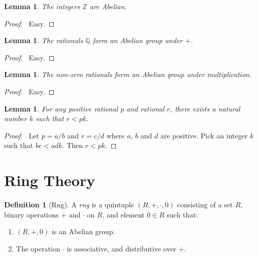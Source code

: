 \documentclass{article}
\let\qed\relax
\newtheorem{lemma}[axiom]{Lemma}
\theoremstyle{definition}
\newtheorem{definition}[axiom]{Definition}
\begin{document}
    \begin{lemma}
        The integers $\mathbb{Z}$ are Abelian.
    \end{lemma}

    \begin{proof}
        \pf\ Easy. \qed
    \end{proof}

    \begin{lemma}
        The rationals $\mathbb{Q}$ form an Abelian group under $+$.
    \end{lemma}

    \begin{proof}
        \pf\ Easy.
    \end{proof}

    \begin{lemma}
        The non-zero rationals form an Abelian group under multiplication.
    \end{lemma}

    \begin{proof}
        \pf\ Easy. \qed
    \end{proof}

    \begin{lemma}
        \label{lemma:rationals_Archimedean}
        For any positive rational $p$ and rational $r$, there exists a natural number $k$ such that
        $r < pk$.
    \end{lemma}

    \begin{proof}
        \pf\ Let $p = a/b$ and $r = c/d$ where $a$, $b$ and $d$ are positive. 
        Pick an integer $k$ such that $bc < adk$. Then $r < pk$. \qed
    \end{proof}

    \section{Ring Theory}

    \begin{definition}[Rng]
        A \emph{rng} is a quintuple $(R, +, \cdot, 0)$ consisting of a set $R$,
        binary operations $+$ and $\cdot$ on $R$, and element $0 \in R$ such that:
        \begin{enumerate}
            \item $(R, +, 0)$ is an Abelian group.
            \item The operation $\cdot$ is associative, and distributive over $+$.
        \end{enumerate}
    \end{definition}
\end{document}
